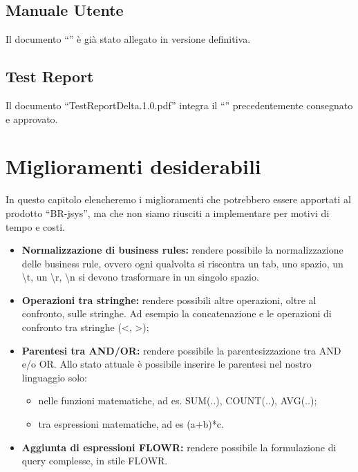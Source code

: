 \section{Manuale Utente}
Il documento ``\MU'' \`e gi\`a stato allegato in versione definitiva.
\section{Test Report}
Il documento ``TestReportDelta.1.0.pdf'' integra il ``\TR'' precedentemente consegnato e approvato.
\chapter{Miglioramenti desiderabili}
In questo capitolo elencheremo i miglioramenti che potrebbero essere apportati al prodotto ``BR-jsys'', ma che non siamo riusciti a implementare per motivi di tempo e costi. 
\begin{itemize}
\item \textbf{Normalizzazione di business rules:} rendere possibile la normalizzazione delle business rule, ovvero ogni qualvolta si riscontra un tab, uno spazio, un \textbackslash t, un \textbackslash r, \textbackslash n si devono trasformare in un singolo spazio. 
\item \textbf{Operazioni tra stringhe:} rendere possibili altre operazioni, oltre al confronto, sulle stringhe. Ad esempio la concatenazione e le operazioni di confronto tra stringhe (\textless, \textgreater); 
\item \textbf{Parentesi tra AND/OR:} rendere possibile la parentesizzazione tra AND e/o OR. Allo stato attuale \`e possibile inserire le parentesi nel nostro linguaggio solo:
\begin{itemize}
\item nelle funzioni matematiche, ad es. SUM(..), COUNT(..), AVG(..);
\item tra espressioni matematiche, ad es (a+b)*c.
\end{itemize}
\item \textbf{Aggiunta di espressioni FLOWR:} rendere possibile la formulazione di query complesse, in stile FLOWR.
\end{itemize}

